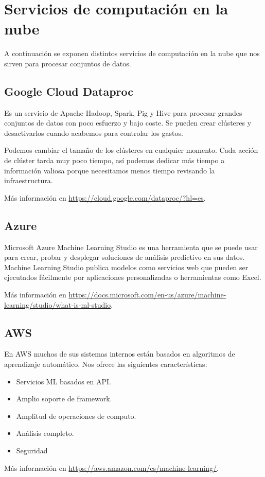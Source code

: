 \section{Servicios de computación en la nube}
A continuación se exponen distintos servicios de computación en la nube que nos sirven para procesar conjuntos de datos.

\subsection{Google Cloud Dataproc}
Es un servicio de Apache Hadoop, Spark, Pig y Hive para procesar grandes conjuntos de datos con poco esfuerzo y bajo coste. Se pueden crear clústeres y desactivarlos cuando acabemos para  controlar los gastos.

Podemos cambiar el tamaño de los clústeres en cualquier momento. Cada acción de clúster tarda muy poco tiempo, así podemos dedicar más tiempo a información valiosa porque necesitamos menos tiempo revisando la infraestructura.

Más información en \url{https://cloud.google.com/dataproc/?hl=es}.

\subsection{Azure}
Microsoft Azure Machine Learning Studio es una herramienta que se puede usar para crear, probar y desplegar soluciones de análisis predictivo en sus datos. Machine Learning Studio publica modelos como servicios web que pueden ser ejecutados fácilmente por aplicaciones personalizadas o herramientas como Excel.

Más información en \url{https://docs.microsoft.com/en-us/azure/machine-learning/studio/what-is-ml-studio}.

\subsection{AWS}
En AWS muchos de sus sistemas internos están basados en  algoritmos de aprendizaje automático. Nos ofrece las siguientes características:
\begin{itemize}
	\item Servicios ML basados en API.
	\item Amplio soporte de framework.
	\item Amplitud de operaciones de computo.
	\item Análisis completo.
	\item Seguridad
\end{itemize}

Más información en \url{https://aws.amazon.com/es/machine-learning/}.	